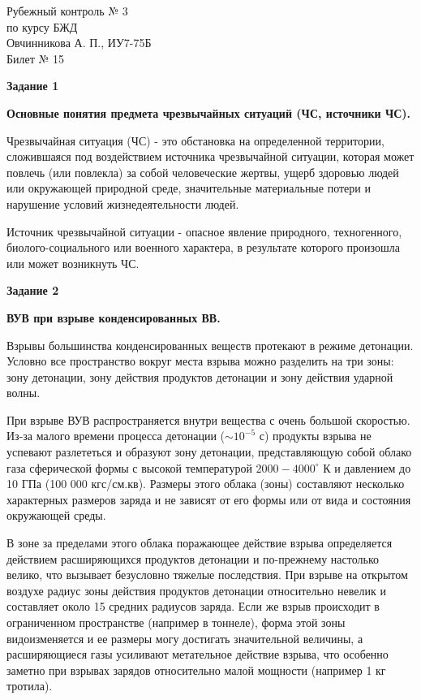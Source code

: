\documentclass[a4paper,14pt]{article}
\begin{document}
\begin{center}
	Рубежный контроль № 3  \\
	по курсу БЖД \\
	Овчинникова А. П., ИУ7-75Б \\
	Билет № 15
\end{center}


\textbf{Задание 1}

\textbf{Основные понятия предмета чрезвычайных ситуаций (ЧС, источники ЧС).}

Чрезвычайная ситуация (ЧС) - это обстановка на определенной территории, сложившаяся под воздействием источника чрезвычайной ситуации, которая может повлечь (или повлекла) за собой человеческие жертвы, ущерб здоровью людей или окружающей природной среде, значительные материальные потери и нарушение условий жизнедеятельности людей.

Источник чрезвычайной ситуации - опасное явление природного, техногенного, биолого-социального или военного характера, в результате которого произошла или может возникнуть ЧС.

\textbf{Задание 2}

\textbf{ВУВ при взрыве конденсированных ВВ.}

Взрывы большинства конденсированных веществ протекают в режиме детонации. Условно все пространство вокруг места взрыва можно разделить на три зоны: зону детонации, зону действия продуктов детонации и зону действия ударной волны.

При взрыве ВУВ распространяется внутри вещества с очень большой скоростью. Из-за малого времени процесса детонации ($\sim 10^{-5}$ с) продукты взрыва не успевают разлететься и образуют зону детонации, представляющую собой облако газа сферической формы с высокой температурой $2000-4000^{\circ}$ К и давлением до 10 ГПа (100 000 кгс/см.кв). Размеры этого облака (зоны) составляют несколько характерных размеров заряда и не зависят от его формы или от вида и состояния окружающей среды.

В зоне за пределами этого облака поражающее действие взрыва определяется действием расширяющихся продуктов детонации и по-прежнему настолько велико, что вызывает безусловно тяжелые последствия. При взрыве на открытом воздухе радиус зоны действия продуктов детонации относительно невелик и составляет около 15 средних радиусов заряда. Если же взрыв происходит в ограниченном пространстве (например в тоннеле), форма этой зоны видоизменяется и ее размеры могу достигать значительной величины, а расширяющиеся газы усиливают метательное действие взрыва, что особенно заметно при взрывах зарядов относительно малой мощности (например 1 кг тротила).
\end{document}
